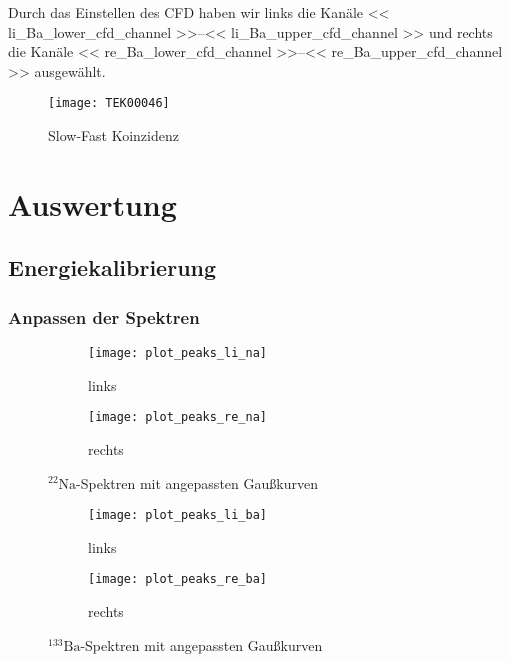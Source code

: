 \documentclass[11pt, ngerman, fleqn, DIV=15, headinclude, BCOR=2cm]{scrreprt}
\begin{document}
Durch das Einstellen des CFD haben wir links die Kanäle
\numrange{<< li_Ba_lower_cfd_channel >>}{<< li_Ba_upper_cfd_channel >>} und rechts
die Kanäle
\numrange{<< re_Ba_lower_cfd_channel >>}{<< re_Ba_upper_cfd_channel >>} ausgewählt.


\begin{figure}
	\centering
	\texttt{[image: TEK00046]}
	\caption{%
		Slow-Fast Koinzidenz
	}
	\label{fig:ba_slow_fast_koinzidenz}
\end{figure}

\fehlt%

\chapter{Auswertung}
\section{Energiekalibrierung}

\subsection{Anpassen der Spektren}
\begin{figure}[h]
	\centering
	\begin{subfigure}{0.49 \textwidth}
		\texttt{[image: plot\_peaks\_li\_na]}
		\caption{%
			links
		}
		\label{fig:na_peaks-li_plot}
	\end{subfigure}
	\begin{subfigure}{0.49 \textwidth}
		\texttt{[image: plot\_peaks\_re\_na]}
		\caption{%
			rechts
		}
		\label{fig:na_peaks-re_plot}
	\end{subfigure}
	\caption{%
		$^{22}\text{Na}$-Spektren mit angepassten Gaußkurven
	}
	\label{fig:na_peaks_plot}
\end{figure}
\begin{figure}[h]
	\centering
	\begin{subfigure}{0.49 \textwidth}
		\texttt{[image: plot\_peaks\_li\_ba]}
		\caption{%
			links
		}
		\label{fig:ba_peaks-li_plot}
	\end{subfigure}
	\begin{subfigure}{0.49 \textwidth}
		\texttt{[image: plot\_peaks\_re\_ba]}
		\caption{%
			rechts
		}
		\label{fig:ba_peaks-re_plot}
	\end{subfigure}
	\caption{%
		$^{133}\text{Ba}$-Spektren mit angepassten Gaußkurven
	}
	\label{fig:ba_peaks_plot}
\end{figure}
\end{document}
